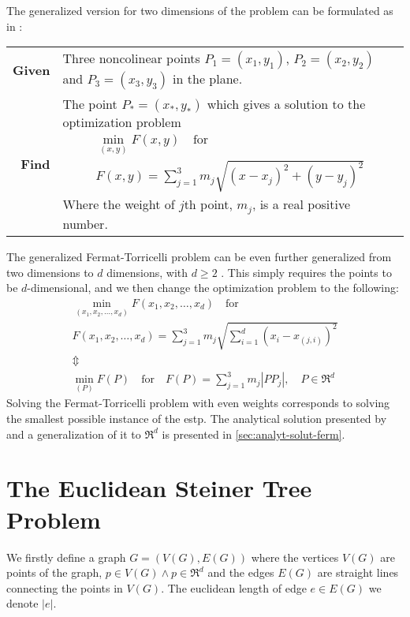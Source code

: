 The generalized version for two dimensions of the problem can be formulated as in
\textcite{uteshev2014}:
%
\begin{center}
  \begin{tabular}{rp{9cm}}
    \toprule
    \textbf{Given} & Three noncolinear points $P_1 = (x_1, y_1)$, $P_2 = (x_2,
                     y_2)$ and $P_3 = (x_3, y_3)$ in the plane. \\
    \textbf{Find} & The point $P_\ast = (x_\ast, y_\ast)$ which gives a solution
                    to the optimization problem
                    \begin{gather}
                      \min_{(x,y)} F(x,y) \quad \text{for} \\
                      F(x,y) = \sum_{j=1}^3 m_j \sqrt{{(x-x_j)}^2 + {(y-y_j)}^2}
                    \end{gather}
    Where the weight of $j$th point, $m_j$, is a real positive number. \\
    \bottomrule
  \end{tabular}
\end{center}
%
The generalized Fermat-Torricelli problem can be even further generalized from
two dimensions to $d$ dimensions, with $d \ge 2$
\cite{fermattorricelliproblem}. This simply requires the points to be
$d$-dimensional, and we then change the optimization problem to the following:
%
\begin{gather}
  \min_{(x_1, x_2, \ldots, x_d)} F(x_1, x_2, \ldots, x_d) \quad \text{for} \\
  F(x_1, x_2, \ldots, x_d) = \sum_{j=1}^3 m_j
  \sqrt{\sum_{i=1}^d {(x_i - x_{(j,i)})}^2 }
  \\ \Updownarrow \\
  \label{eq:4}
  \min_{(P)} F(P) \quad \text{for} \quad
  F(P) = \sum_{j=1}^3 m_j | P P_j |, \quad P \in \Re^d
\end{gather}
%
Solving the Fermat-Torricelli problem with even weights corresponds to solving
the smallest possible instance of the \acrlong{estp}. The analytical solution
presented by~\textcite{uteshev2014} and a generalization of it to $\Re^d$ is
presented in \cref{sec:analyt-solut-ferm}.

\section{The Euclidean Steiner Tree Problem}
\label{sec:eucl-stein-tree}

We firstly define a graph $G = (V(G), E(G))$ where the vertices $V(G)$ are
points of the graph, $p \in V(G) \land p \in \Re^d$ and the edges $E(G)$ are
straight lines connecting the points in $V(G)$. The euclidean length of edge $e \in
E(G)$ we denote $|e|$.

